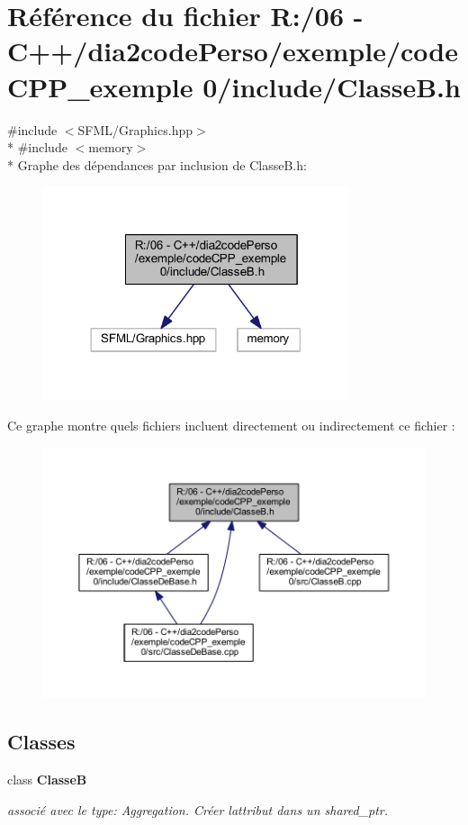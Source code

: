 \section{Référence du fichier R\+:/06 -\/ C++/dia2code\+Perso/exemple/code\+C\+P\+P\+\_\+exemple 0/include/\+Classe\+B.h}
\label{_classe_b_8h}
{\ttfamily \#include $<$S\+F\+M\+L/\+Graphics.\+hpp$>$}\\*
{\ttfamily \#include $<$memory$>$}\\*
Graphe des dépendances par inclusion de Classe\+B.\+h\+:\nopagebreak
\begin{figure}[H]
\begin{center}
\leavevmode
\includegraphics[width=254pt]{_classe_b_8h__incl}
\end{center}
\end{figure}
Ce graphe montre quels fichiers incluent directement ou indirectement ce fichier \+:\nopagebreak
\begin{figure}[H]
\begin{center}
\leavevmode
\includegraphics[width=350pt]{_classe_b_8h__dep__incl}
\end{center}
\end{figure}
\subsection*{Classes}
\begin{DoxyCompactItemize}
\item 
class {\bf Classe\+B}
\begin{DoxyCompactList}\small\item\em associé avec le type\+: \textquotesingle{}Aggregation\textquotesingle{}. Créer l\textquotesingle{}attribut dans un shared\+\_\+ptr. \end{DoxyCompactList}\end{DoxyCompactItemize}
